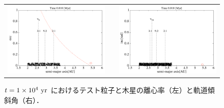 \documentclass[11pt,a4paper,oneside,onecolumn]{jreport}
\begin{document}
\begin{figure}[H]
\begin{tabular}{ccc}
\begin{minipage}[t]{0.45\hsize}
\centering
\includegraphics[width=8cm]{./image/asteroid_ecc_10kyr.pdf}
\end{minipage} &
\begin{minipage}[t]{0.1\hsize}
\end{minipage} &
\begin{minipage}[t]{0.45\hsize}
\centering
\includegraphics[width=8cm]{./image/asteroid_inc_10kyr.pdf}
\end{minipage}\\
%
\end{tabular}
\caption{$t = 1 \times 10^4\ {\rm yr}$ におけるテスト粒子と木星の離心率（左）と軌道傾斜角（右）．\label{fig:asteroid_ecc_inc_10kyr}}
\end{figure}
\end{document}
